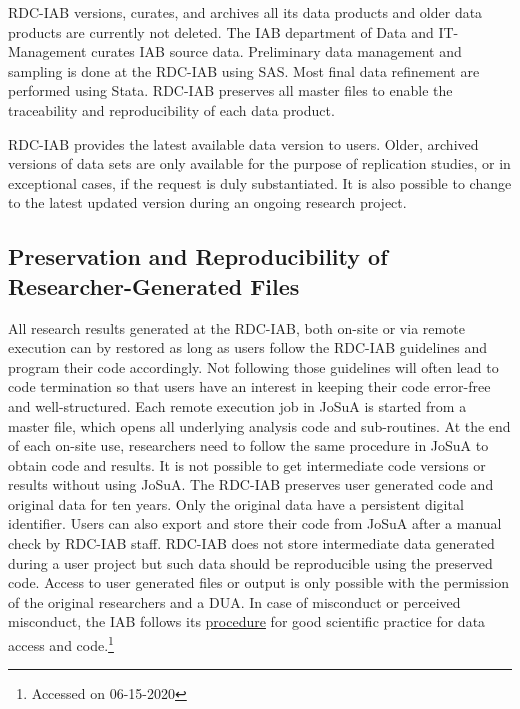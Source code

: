 RDC-IAB versions, curates, and archives all its data products and older data products are currently not deleted. The IAB department of Data and IT-Management curates IAB source data. Preliminary data management and sampling is done at the RDC-IAB using SAS. Most final data refinement are performed using Stata. RDC-IAB preserves all master files to enable the traceability and reproducibility of each data product.

RDC-IAB provides the latest available data version to users. Older, archived versions of data sets are only available for the purpose of replication studies, or in exceptional cases, if the request is duly substantiated. It is also possible to change to the latest updated version during an ongoing research project.

\hypertarget{preservation-and-reproducibility-of-researcher-generated-files}{%
\subsection{Preservation and Reproducibility of Researcher-Generated Files}\label{preservation-and-reproducibility-of-researcher-generated-files}}

All research results generated at the RDC-IAB, both on-site or via remote execution can by restored as long as users follow the RDC-IAB guidelines and program their code accordingly. Not following those guidelines will often lead to code termination so that users have an interest in keeping their code error-free and well-structured. Each remote execution job in JoSuA is started from a master file, which opens all underlying analysis code and sub-routines. At the end of each on-site use, researchers need to follow the same procedure in JoSuA to obtain code and results. It is not possible to get intermediate code versions or results without using JoSuA. The RDC-IAB preserves user generated code and original data for ten years. Only the original data have a persistent digital identifier. Users can also export and store their code from JoSuA after a manual check by RDC-IAB staff. RDC-IAB does not store intermediate data generated during a user project but such data should be reproducible using the preserved code. Access to user generated files or output is only possible with the permission of the original researchers and a DUA. In case of misconduct or perceived misconduct, the IAB follows its \href{https://www.iab.de/en/daten/replikationen.aspx}{procedure} for good scientific practice for data access and code.\footnote{Accessed on 06-15-2020}

